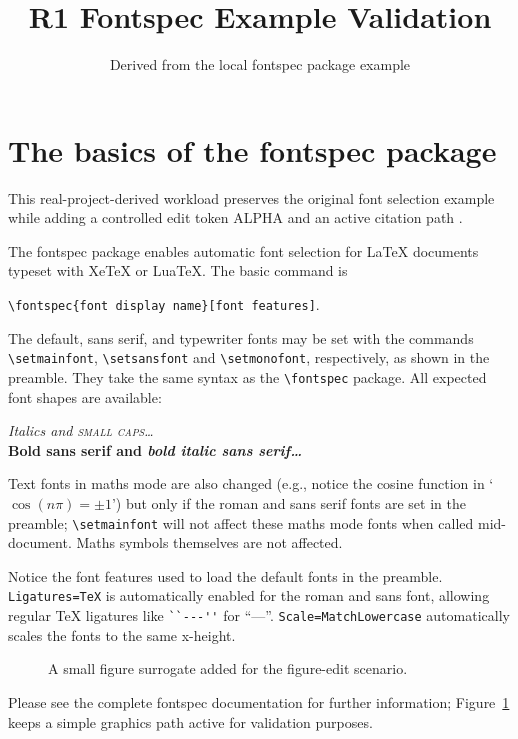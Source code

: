 \documentclass{article}
\title{R1 Fontspec Example Validation}
\author{Derived from the local fontspec package example}
\date{}
\newcommand{\benchtexttoken}{ALPHA}
\newcommand{\benchfiguretoken}{1.00}
\begin{document}
\maketitle
\pagestyle{empty}

\section*{The basics of the \textsf{fontspec} package}

This real-project-derived workload preserves the original font selection example while adding a controlled edit token \benchtexttoken{} and an active citation path \cite{refalpha}.

The \textsf{fontspec} package enables automatic font selection
for \LaTeX{} documents typeset with Xe\TeX{} or Lua\TeX.
The basic command is

{\centering \verb|\fontspec{font display name}[font features]|.\par}

The default, sans serif, and typewriter fonts may be set with the
commands \verb|\setmainfont|, \verb|\setsansfont| and \verb|\setmonofont|,
respectively, as shown in the preamble. They take the
same syntax as the \verb|\fontspec| package. All expected font
shapes are available:

\begin{center}
  {\itshape Italics and \scshape small caps\dots}\\
  {\sffamily\bfseries Bold sans serif and \itshape bold italic sans serif\dots}
\end{center}

Text fonts in maths mode are also changed (e.g., notice the cosine function in
`$\cos(n\pi)=\pm 1$') but only if the roman and sans serif fonts are set in
the preamble; \verb|\setmainfont| will not affect these maths mode fonts when
called mid-document.
Maths symbols themselves are not affected.

Notice the font features used to load the default fonts in the preamble.
\verb|Ligatures=TeX| is automatically enabled for the roman and sans font,
allowing regular \TeX{} ligatures like \verb|``---''| for ``---''.
\verb|Scale=MatchLowercase| automatically scales the fonts to
the same x-height.

\begin{figure}[h]
\centering
{}
\caption{A small figure surrogate added for the figure-edit scenario.}
\label{fig:fontspec-strip}
\end{figure}

Please see the complete \textsf{fontspec} documentation for further
information; Figure~\ref{fig:fontspec-strip} keeps a simple graphics path active for validation purposes.



\end{document}
